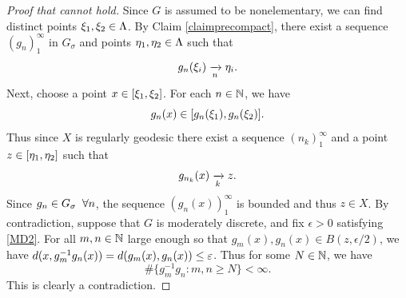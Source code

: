 \begin{proof}[Proof that  cannot hold]
Since $G$ is assumed to be nonelementary, we can find distinct points $\xi_1,\xi_2\in \Lambda$. By Claim \ref{claimprecompact}, there exist a sequence $(g_n)_1^\infty$ in $G_\sigma$ and points $\eta_1,\eta_2\in\Lambda$ such that
\[
g_n(\xi_i)\xrightarrow[n]{} \eta_i.
\]
Next, choose a point $x\in[\xi_1,\xi_2]$. For each $n\in\N$, we have
\[
g_n(x)\in[g_n(\xi_1),g_n(\xi_2)].
\]
Thus since $X$ is regularly geodesic there exist a sequence $(n_k)_1^\infty$ and a point $z\in [\eta_1,\eta_2]$ such that
\[
g_{n_k}(x)\xrightarrow[k]{} z.
\]
Since $g_n\in G_\sigma \;\;\forall n$, the sequence $(g_n(x))_1^\infty$ is bounded and thus $z\in X$. By contradiction, suppose that $G$ is moderately discrete, and fix $\epsilon > 0$ satisfying \eqref{MD2}. For all $m,n\in\N$ large enough so that $g_m(x),g_n(x)\in B(z,\epsilon/2)$, we have $d(x,g_m^{-1} g_n(x)) = d(g_m(x),g_n(x)) \leq \varepsilon$. Thus for some $N\in\N$, we have 
\[
\#\{g_m^{-1} g_n : m,n\geq N\} < \infty.
\] 
This is clearly a contradiction.
\end{proof}

